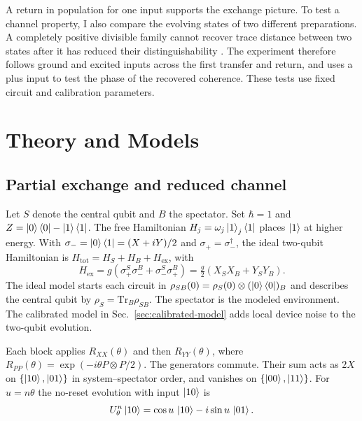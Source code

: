 \documentclass[
    pra,
    showpacs,
    groupedaddress,
    notitlepage,
    floatfix,
    nofootinbib
]{revtex4-2}
\def\Tr{\mathrm{Tr}}
\begin{document}
A return in population for one input supports the exchange picture. To test a channel property, I also compare the evolving states 
of two different preparations. A completely positive divisible family cannot recover trace distance between two states after it has 
reduced their distinguishability \cite{rivas,blp}. The experiment therefore follows ground and excited inputs across the first 
transfer and return, and uses a plus input to test the phase of the recovered coherence. These tests use fixed circuit and calibration parameters.

\section{Theory and Models}
\subsection{Partial exchange and reduced channel}
Let $S$ denote the central qubit and $B$ the spectator. Set $\hbar=1$ and $Z=\ket0\bra0-\ket1\bra1$. The free 
Hamiltonian $H_j=\omega_j\ket1_j\bra1$ places $\ket1$ at higher energy. With $\sigma_-=\ket0\bra1=(X+iY)/2$ and 
$\sigma_+=\sigma_-^\dagger$, the ideal two-qubit Hamiltonian is $H_{\mathrm{tot}}=H_S+H_B+H_{\mathrm{ex}}$, with
\begin{equation}
 H_{\mathrm{ex}}=g(\sigma_+^S\sigma_-^B+\sigma_-^S\sigma_+^B)
 =\tfrac{g}{2}(X_S X_B+Y_S Y_B).
 \label{eq:h}
\end{equation}
The ideal model starts each circuit in $\rho_{SB}(0)=\rho_S(0)\otimes(\ket0\bra0)_B$ and describes the central qubit by
$\rho_S=\Tr_B\rho_{SB}$. The spectator is the modeled environment. The calibrated model in Sec.~\ref{sec:calibrated-model}
adds local device noise to the two-qubit evolution.

Each block applies $R_{XX}(\theta)$ and then $R_{YY}(\theta)$, where 
$R_{PP}(\theta)=\exp(-i\theta P\otimes P/2)$. The generators commute. Their sum acts as $2X$ on $\{\ket{10},\ket{01}\}$ 
in system--spectator order, and vanishes on $\{\ket{00},\ket{11}\}$. For $u=n\theta$ the no-reset evolution with input $\ket{10}$ is
\begin{equation}
 U_\theta^n\ket{10}
 =\cos u\,\ket{10}-i\sin u\,\ket{01}.
 \label{eq:exchange}
\end{equation}
\end{document}
